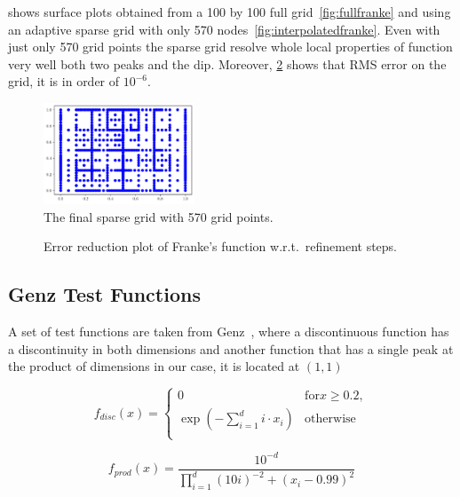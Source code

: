  shows surface plots obtained from a 100 by 100 full grid~\cref{fig:fullfranke} and using an adaptive sparse grid with only 570 nodes~\cref{fig:interpolatedfranke}.
Even with just only 570 grid points the sparse grid resolve whole local properties of function very well both two peaks and the dip. Moreover, \cref{fig:frankeerr} shows that RMS error on the grid, it is in order of \(10^{-6}\).
\begin{figure}
    \centering
    \includegraphics[width=0.4\textwidth]{figures/grid_final_franke.pdf}
    \caption{The final sparse grid with 570 grid points.}
    \label{fig:frankegrid}
\end{figure}

\begin{figure}
    \centering
    \scalebox{0.9}{}
    \caption{Error reduction plot of Franke's function w.r.t.\ refinement steps.}
    \label{fig:frankeerr}
\end{figure}

\subsection{Genz Test Functions}\label{sec:genzfunc}

A set of test functions are taken from Genz~\cite{Genz1987},
where a discontinuous function has a discontinuity in both dimensions and another function that has a single peak at the product of dimensions
in our case, it is located at \((1,1)\)

\begin{equation}
    f_{disc}(x) = \left\{
    \begin{array}{ll}
        0                                             & \text{for} x \ge 0.2 , \\
        \exp\left(- \sum_{i=1}^{d} i \cdot x_i\right) & \text{otherwise}       \\
    \end{array}
    \right.
\end{equation}

\begin{equation}
    f_{prod}(x) = \frac{10^{-d}}{\prod_{i=1}^d (10i)^{-2} + \left( x_i -0.99\right)^2}
    \label{eqn:productpeak}
\end{equation}

